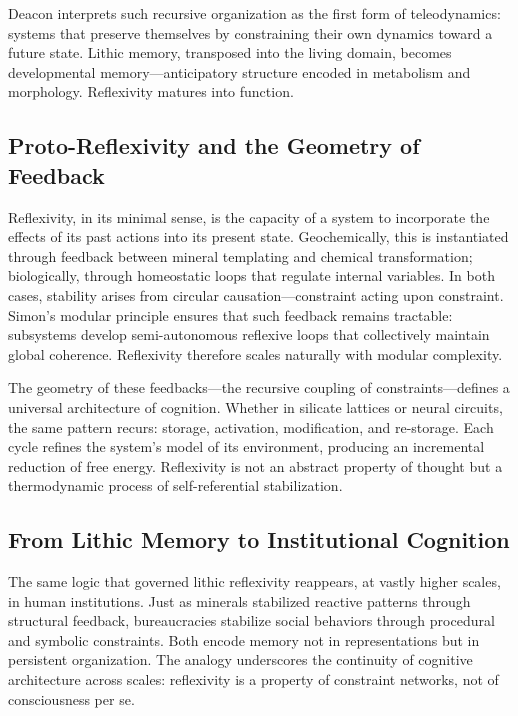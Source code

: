 \documentclass[11pt,a4paper]{article}
\begin{document}
Deacon \citep{Deacon2011IncompleteNature} interprets such recursive organization as the first form of teleodynamics: systems that preserve themselves by constraining their own dynamics toward a future state.  Lithic memory, transposed into the living domain, becomes developmental memory—anticipatory structure encoded in metabolism and morphology.  Reflexivity matures into function.

\subsection{Proto-Reflexivity and the Geometry of Feedback}

Reflexivity, in its minimal sense, is the capacity of a system to incorporate the effects of its past actions into its present state.  Geochemically, this is instantiated through feedback between mineral templating and chemical transformation; biologically, through homeostatic loops that regulate internal variables.  In both cases, stability arises from circular causation—constraint acting upon constraint.  Simon’s modular principle \citep{Simon1962ArchitectureComplexity} ensures that such feedback remains tractable: subsystems develop semi-autonomous reflexive loops that collectively maintain global coherence.  Reflexivity therefore scales naturally with modular complexity.

The geometry of these feedbacks—the recursive coupling of constraints—defines a universal architecture of cognition.  Whether in silicate lattices or neural circuits, the same pattern recurs: storage, activation, modification, and re-storage.  Each cycle refines the system’s model of its environment, producing an incremental reduction of free energy.  Reflexivity is not an abstract property of thought but a thermodynamic process of self-referential stabilization.

\subsection{From Lithic Memory to Institutional Cognition}

The same logic that governed lithic reflexivity reappears, at vastly higher scales, in human institutions.  Just as minerals stabilized reactive patterns through structural feedback, bureaucracies stabilize social behaviors through procedural and symbolic constraints.  Both encode memory not in representations but in persistent organization.  The analogy underscores the continuity of cognitive architecture across scales: reflexivity is a property of constraint networks, not of consciousness per se.
\end{document}
